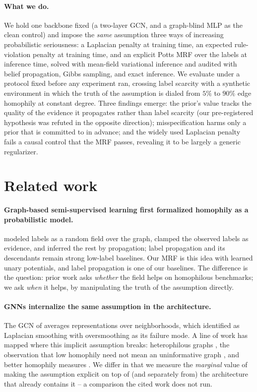 \documentclass{article}
\begin{document}
\paragraph{What we do.} We hold one backbone fixed (a two-layer GCN, and a graph-blind MLP as
the clean control) and impose the \emph{same} assumption three ways of increasing probabilistic
seriousness: a Laplacian penalty at training time, an expected rule-violation penalty at
training time, and an explicit Potts MRF over the labels at inference time, solved with
mean-field variational inference and audited with belief propagation, Gibbs sampling, and exact
inference. We evaluate under a protocol fixed before any experiment ran, crossing label scarcity
with a synthetic environment in which the truth of the assumption is dialed from $5\%$ to
$90\%$ edge homophily at constant degree. Three findings emerge: the prior's value tracks the
quality of the evidence it propagates rather than label scarcity (our pre-registered hypothesis
was refuted in the opposite direction); misspecification harms only a prior that is committed to
in advance; and the widely used Laplacian penalty fails a causal control that the MRF passes,
revealing it to be largely a generic regularizer.

\section{Related work}

\paragraph{Graph-based semi-supervised learning first formalized homophily as a probabilistic
model.} \citet{zhu2003semi} modeled labels as a random field over the graph, clamped the
observed labels as evidence, and inferred the rest by propagation; label propagation and its
descendants remain strong low-label baselines. Our MRF is this idea with learned unary
potentials, and label propagation is one of our baselines. The difference is the question: prior
work asks \emph{whether} the field helps on homophilous benchmarks; we ask \emph{when} it helps,
by manipulating the truth of the assumption directly.

\paragraph{GNNs internalize the same assumption in the architecture.} The GCN of
\citet{kipf2017semi} averages representations over neighborhoods, which \citet{li2018deeper}
identified as Laplacian smoothing with oversmoothing as its failure mode. A line of work has
mapped where this implicit assumption breaks: heterophilous graphs \citep{zhu2020beyond},
the observation that low homophily need not mean an uninformative graph \citep{ma2022homophily},
and better homophily measures \citep{platonov2023characterizing}. We differ in that we measure
the \emph{marginal} value of making the assumption explicit on top of (and separately from) the
architecture that already contains it -- a comparison the cited work does not run.
\end{document}
